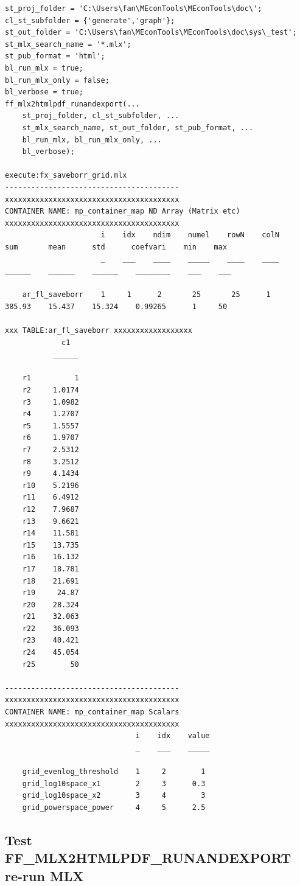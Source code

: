 \documentclass[
]{book}
\begin{document}
\begin{verbatim}
st_proj_folder = 'C:\Users\fan\MEconTools\MEconTools\doc\';
cl_st_subfolder = {'generate','graph'};
st_out_folder = 'C:\Users\fan\MEconTools\MEconTools\doc\sys\_test';
st_mlx_search_name = '*.mlx';
st_pub_format = 'html';
bl_run_mlx = true;
bl_run_mlx_only = false;
bl_verbose = true;
ff_mlx2htmlpdf_runandexport(...
    st_proj_folder, cl_st_subfolder, ...
    st_mlx_search_name, st_out_folder, st_pub_format, ...
    bl_run_mlx, bl_run_mlx_only, ...
    bl_verbose);

execute:fx_saveborr_grid.mlx
----------------------------------------
xxxxxxxxxxxxxxxxxxxxxxxxxxxxxxxxxxxxxxxx
CONTAINER NAME: mp_container_map ND Array (Matrix etc)
xxxxxxxxxxxxxxxxxxxxxxxxxxxxxxxxxxxxxxxx
                      i    idx    ndim    numel    rowN    colN     sum       mean      std      coefvari    min    max
                      _    ___    ____    _____    ____    ____    ______    ______    ______    ________    ___    ___

    ar_fl_saveborr    1     1      2       25       25      1      385.93    15.437    15.324    0.99265      1     50 

xxx TABLE:ar_fl_saveborr xxxxxxxxxxxxxxxxxx
             c1  
           ______

    r1          1
    r2     1.0174
    r3     1.0982
    r4     1.2707
    r5     1.5557
    r6     1.9707
    r7     2.5312
    r8     3.2512
    r9     4.1434
    r10    5.2196
    r11    6.4912
    r12    7.9687
    r13    9.6621
    r14    11.581
    r15    13.735
    r16    16.132
    r17    18.781
    r18    21.691
    r19     24.87
    r20    28.324
    r21    32.063
    r22    36.093
    r23    40.421
    r24    45.054
    r25        50

----------------------------------------
xxxxxxxxxxxxxxxxxxxxxxxxxxxxxxxxxxxxxxxx
CONTAINER NAME: mp_container_map Scalars
xxxxxxxxxxxxxxxxxxxxxxxxxxxxxxxxxxxxxxxx
                              i    idx    value
                              _    ___    _____

    grid_evenlog_threshold    1     2        1 
    grid_log10space_x1        2     3      0.3 
    grid_log10space_x2        3     4        3 
    grid_powerspace_power     4     5      2.5 
\end{verbatim}

\hypertarget{test-ff_mlx2htmlpdf_runandexport-re-run-mlx}{%
\subsection{Test FF\_MLX2HTMLPDF\_RUNANDEXPORT re-run MLX}\label{test-ff_mlx2htmlpdf_runandexport-re-run-mlx}}
\end{document}
